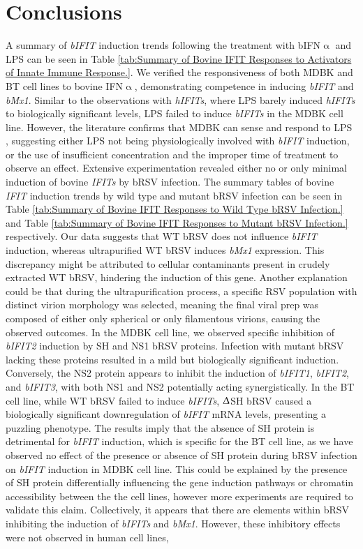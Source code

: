 \section{Conclusions} \label{sec:Conclusions Chapter2}
A summary of \textit{bIFIT} induction trends following the treatment with bIFN$\upalpha$ and LPS can be seen in Table \ref{tab:Summary of Bovine IFIT Responses to Activators of Innate Immune Response.}. We verified the responsiveness of both MDBK and BT cell lines to bovine IFN$\upalpha$, demonstrating competence in inducing \textit{bIFIT} and \textit{bMx1}. Similar to the observations with \textit{hIFITs}, where LPS barely induced \textit{hIFITs} to biologically significant levels, LPS failed to induce \textit{bIFITs} in the MDBK cell line. However, the literature confirms that MDBK can sense and respond to LPS \cite{Cui2022ThePathway}, suggesting either LPS not being physiologically involved with \textit{bIFIT} induction, or the use of insufficient concentration and the improper time of treatment to observe an effect. Extensive experimentation revealed either no or only minimal induction of bovine \textit{IFITs} by bRSV infection. The summary tables of bovine \textit{IFIT} induction trends by wild type and mutant bRSV infection can be seen in Table \ref{tab:Summary of Bovine IFIT Responses to Wild Type bRSV Infection.} and Table \ref{tab:Summary of Bovine IFIT Responses to Mutant bRSV Infection.} respectively. Our data suggests that WT bRSV does not influence \textit{bIFIT} induction, whereas ultrapurified WT bRSV induces \textit{bMx1} expression. This discrepancy might be attributed to cellular contaminants present in crudely extracted WT bRSV, hindering the induction of this gene. Another explanation could be that during the ultrapurification process, a specific RSV population with distinct virion morphology was selected, meaning the final viral prep was composed of either only spherical or only filamentous virions, causing the observed outcomes. In the MDBK cell line, we observed specific inhibition of \textit{bIFIT2} induction by SH and NS1 bRSV proteins. Infection with mutant bRSV lacking these proteins resulted in a mild but biologically significant induction. Conversely, the NS2 protein appears to inhibit the induction of \textit{bIFIT1}, \textit{bIFIT2}, and \textit{bIFIT3}, with both NS1 and NS2 potentially acting synergistically. In the BT cell line, while WT bRSV failed to induce \textit{bIFITs}, $\Updelta$SH bRSV caused a biologically significant downregulation of \textit{bIFIT} mRNA levels, presenting a puzzling phenotype. The results imply that the absence of SH protein is detrimental for \textit{bIFIT} induction, which is specific for the BT cell line, as we have observed no effect of the presence or absence of SH protein during bRSV infection on \textit{bIFIT} induction in MDBK cell line. This could be explained by the presence of SH protein differentially influencing the gene induction pathways or chromatin accessibility between the the cell lines, however more experiments are required to validate this claim. Collectively, it appears that there are elements within bRSV inhibiting the induction of \textit{bIFITs} and \textit{bMx1}. However, these inhibitory effects were not observed in human cell lines, 
